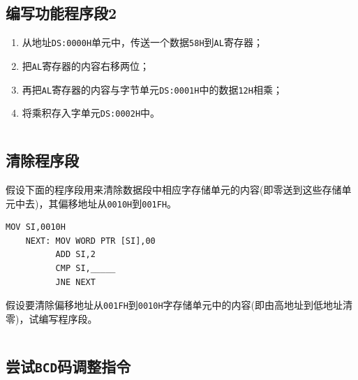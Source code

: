 \documentclass[11pt]{SEU-Digital-Report}
\begin{document}
\begin{lstlisting}[language={[x86masm]Assembler},title=code]

\end{lstlisting}

\subsection{编写功能程序段2}
\begin{enumerate}
    \item 从地址\texttt{DS:0000H}单元中，传送一个数据\texttt{58H}到\texttt{AL}寄存器；
    \item 把\texttt{AL}寄存器的内容右移两位；
    \item 再把\texttt{AL}寄存器的内容与字节单元\texttt{DS:0001H}中的数据\texttt{12H}相乘；
    \item 将乘积存入字单元\texttt{DS:0002H}中。
\end{enumerate}

\begin{lstlisting}[language={[x86masm]Assembler},title=code]

\end{lstlisting}

\subsection{清除程序段}
假设下面的程序段用来清除数据段中相应字存储单元的内容(即零送到这些存储单元中去)，其偏移地址从\texttt{0010H}到\texttt{001FH}。
\begin{lstlisting}[language={[x86masm]Assembler},title=code]
          MOV SI,0010H
    NEXT: MOV WORD PTR [SI],00
          ADD SI,2
          CMP SI,_____   
          JNE NEXT
\end{lstlisting}

假设要清除偏移地址从\texttt{001FH}到\texttt{0010H}字存储单元中的内容(即由高地址到低地址清零)，试编写程序段。
\begin{lstlisting}[language={[x86masm]Assembler},title=code]

\end{lstlisting}

\subsection{尝试\texttt{BCD}码调整指令}
\end{document}
